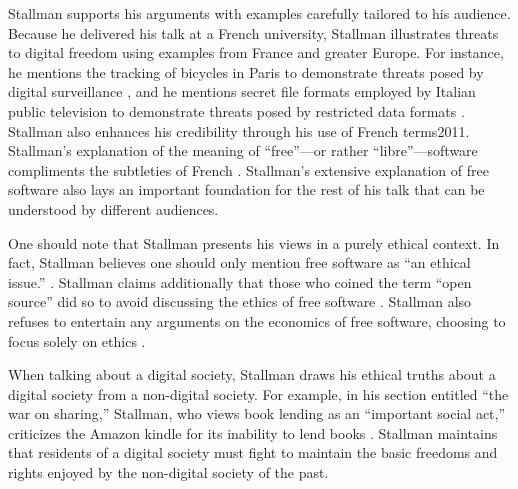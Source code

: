 Stallman supports his arguments with examples carefully tailored to his audience. Because he delivered his talk at a French university, Stallman illustrates threats to digital freedom using examples from France and greater Europe. For instance, he mentions the tracking of bicycles in Paris to demonstrate threats posed by digital surveillance \citeyear[para. 8]{rms2011}, and he mentions secret file formats employed by Italian public television to demonstrate threats posed by restricted data formats \citeyear[para. 30]{rms2011}. Stallman also enhances his credibility through his use of French terms2011. Stallman's explanation of the meaning of “free”—or rather “libre”—software compliments the subtleties of French \citeyear[para. 34]{rms2011}. Stallman's extensive explanation of free software also lays an important foundation for the rest of his talk that can be understood by different audiences.

One should note that Stallman presents his views in a purely ethical context. In fact, Stallman believes one should only mention free software as “an ethical issue.” \citeyear[para. 63]{rms2011}. Stallman claims additionally that those who coined the term “open source” did so to avoid discussing the ethics of free software \citeyear[para. 52]{rms2011}. Stallman also refuses to entertain any arguments on the economics of free software, choosing to focus solely on ethics \citeyear[para. 34]{rms2011}.

When talking about a digital society, Stallman draws his ethical truths about a digital society from a non-digital society. For example, in his section entitled “the war on sharing,” Stallman, who views book lending as an “important social act,” criticizes the Amazon kindle for its inability to lend books \citeyear[para. 98]{rms2011}. Stallman maintains that residents of a digital society must fight to maintain the basic freedoms and rights enjoyed by the non-digital society of the past.

